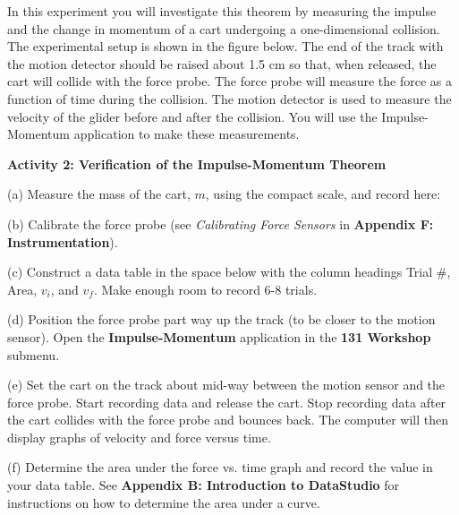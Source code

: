In this experiment you will investigate this theorem by measuring the impulse
and the change in momentum of a cart undergoing a one-dimensional collision.
The experimental setup is shown in the figure below. The end of the track with
the motion detector should be raised about 1.5 cm so that, when released, the
cart will collide with the force probe. The force probe will measure the force
as a function of time during the collision. The motion detector is used to measure
the velocity of the glider before and after the collision. You will use the
Impulse-Momentum application to make these measurements.

\vspace{0.3cm}
{\par\centering {} \par}
\vspace{0.3cm}

\textbf{Activity 2: Verification of the Impulse-Momentum Theorem} 

(a) Measure the mass of the cart, $m$, using the compact scale, and record here:
\vspace{10mm}

(b) Calibrate the force probe (see \textit{Calibrating Force Sensors} 
in \textbf{Appendix F: Instrumentation}).

(c) Construct a data table in the space below with the column headings Trial
\#, Area, \( v_{i} \), and \( v_{f} \). Make enough room to record 6-8 trials.
\vspace{70mm}

(d) Position the force probe part way up the track (to be closer to the motion sensor). Open the \textbf{Impulse-Momentum} application in the \textbf{131 Workshop} submenu. 

(e) Set the cart on the track about mid-way between the motion sensor and the force probe. Start recording data and release the cart. Stop recording data after the cart collides with the force probe and bounces back. The computer will then display graphs of velocity and force versus time.

(f) Determine the area under the force vs. time graph and record the value in
your data table. See \textbf{Appendix B: Introduction to DataStudio} for instructions on how to determine the area under a curve.

